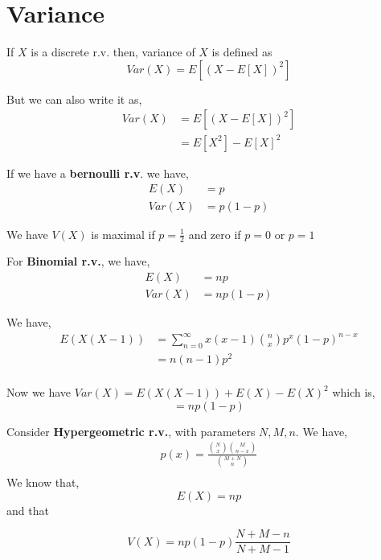 \section{Variance}
\begin{definition}
If $X$ is a discrete r.v. then, variance of $X$ is defined as
\[Var(X) = E[(X - E[X])^2] \]
\end{definition}

\begin{remark}
	But we can also write it as, 
	\begin{align*}
		Var(X) &= E[(X - E[X])^2] \\
		       &= E[X^2] - E[X]^2
	\end{align*}
\end{remark}

\begin{eg}
	If we have a \textbf{bernoulli r.v}. we have, 
	\begin{align*}
		E(X) &= p  \\
		Var(X) &= p(1 - p)  
	\end{align*}

	We have $V(X) $ is maximal if $p = \frac{1}{2}$ and zero if $p = 0$ or  $p = 1$
\end{eg}

\begin{eg}
	For \textbf{Binomial r.v.}, we have,
	\begin{align*}
		E(X) &= np  \\
		Var(X) &= np(1 - p)
	\end{align*}


	We have, 
	\begin{align*}
		E(X(X - 1)) &= \sum_{n=0}^{\infty} x(x - 1) \binom{n}{x} p^x (1 - p)^{n - x} \\
		            &= n(n - 1)p^2 \\
	\end{align*}

	Now we have $Var(X) = E(X(X - 1)) + E(X) - E(X)^2$ which is, 
	$$ = np(1 - p) $$ 


\end{eg}
\begin{eg}
	Consider \textbf{Hypergeometric r.v.}, with parameters $N, M, n$. We have,
	\begin{align*}
		p(x) = \frac{\binom{N}{x} \binom{M }{n - x}}{\binom{M + N}{n}} \\
	\end{align*}
	We know that, 
	$$ E(X) = np $$  and that

	
	$$ V(X) = np(1 - p)\frac{N + M - n}{N + M - 1} $$ 
\end{eg}


